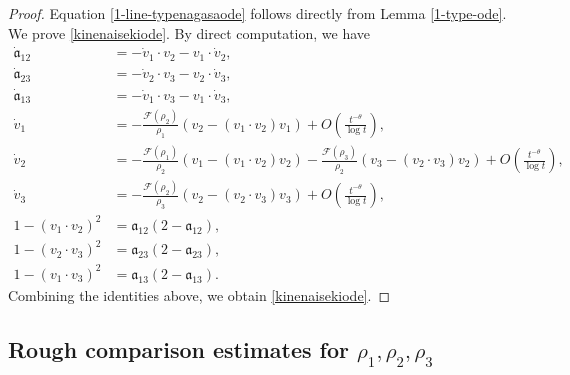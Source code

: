 \documentclass[reqno]{amsart}
\theoremstyle{plain}
\theoremstyle{definition}
\numberwithin{equation}{section}
\begin{document}
\begin{proof}
Equation \eqref{1-line-typenagasaode} follows directly from Lemma \ref{1-type-ode}. We prove \eqref{kinenaisekiode}. By direct computation, we have
\begin{align*}
\dot{\mathfrak{a}}_{12}&=-\dot{v}_1\cdot v_2-v_1\cdot \dot{v}_2,
\\
\dot{\mathfrak{a}}_{23}&=-\dot{v}_2\cdot v_3-v_2\cdot \dot{v}_3,
\\
\dot{\mathfrak{a}}_{13}&=-\dot{v}_1\cdot v_3-v_1\cdot \dot{v}_3,
\\
\dot{v}_1&=-\frac{\mathcal{F}(\rho_2)}{\rho_1}\left(v_2-(v_1\cdot v_2)v_1\right)+O\left(\frac{t^{-\theta}}{\log{t}}\right),
\\
\dot{v}_2&=-\frac{\mathcal{F}(\rho_1)}{\rho_2}\left(v_1-(v_1\cdot v_2)v_2\right)-\frac{\mathcal{F}(\rho_3)}{\rho_2}\left(v_3-(v_2\cdot v_3)v_2\right)+O\left(\frac{t^{-\theta}}{\log{t}}\right),
\\
\dot{v}_3&=-\frac{\mathcal{F}(\rho_2)}{\rho_3}\left(v_2-(v_2\cdot v_3)v_3\right)+O\left(\frac{t^{-\theta}}{\log{t}}\right),
\\
1-\left(v_1\cdot v_2\right)^2&=\mathfrak{a}_{12}(2-\mathfrak{a}_{12}),
\\
1-\left(v_2\cdot v_3\right)^2&=\mathfrak{a}_{23}(2-\mathfrak{a}_{23}),
\\
1-\left(v_1\cdot v_3\right)^2&=\mathfrak{a}_{13}(2-\mathfrak{a}_{13}).
\end{align*}
Combining the identities above, we obtain \eqref{kinenaisekiode}.

\end{proof}


\subsection{Rough comparison estimates for $\rho_1,\rho_2,\rho_3$}
\end{document}
